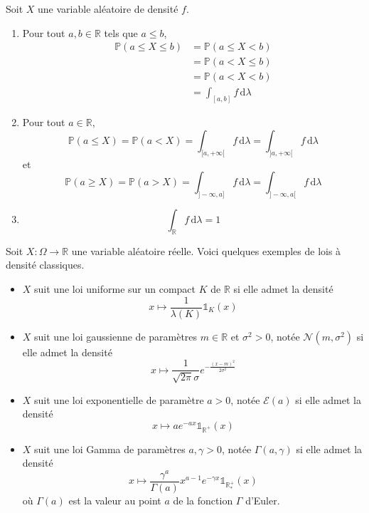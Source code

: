 	\begin{proposition}
		Soit $X$ une variable aléatoire de densité $f$.
		\begin{enumerate}[label=(\roman*)]
			\item Pour tout $a, b \in \mathbb{R}$ tels que $a \leq b$,
			\begin{align*}
				\mathbb{P}(a \leq X \leq b) &= \mathbb{P}(a \leq X < b) \\
				&= \mathbb{P}(a < X \leq b) \\
				&= \mathbb{P}(a < X < b) \\
				&= \int_{[a,b]} f \, \mathrm{d}\lambda
			\end{align*}
			\item Pour tout $a \in \mathbb{R}$,
			\[ \mathbb{P}(a \leq X) = \mathbb{P}(a < X) = \int_{[a,+\infty[} f \, \mathrm{d}\lambda = \int_{]a,+\infty[} f \, \mathrm{d}\lambda \]
			et
			\[ \mathbb{P}(a \geq X) = \mathbb{P}(a > X) = \int_{]-\infty, a]} f \, \mathrm{d}\lambda = \int_{]-\infty, a[} f \, \mathrm{d}\lambda \]
			\item \[ \int_{\mathbb{R}} f \, \mathrm{d}\lambda = 1 \]
		\end{enumerate}
	\end{proposition}


	\begin{example}
		Soit $X : \Omega \rightarrow \mathbb{R}$ une variable aléatoire réelle. Voici quelques exemples de lois à densité classiques.
		\begin{itemize}
			\item $X$ suit une loi uniforme sur un compact $K$ de $\mathbb{R}$ si elle admet la densité
			\[ x \mapsto \frac{1}{\lambda(K)} \mathbb{1}_K(x) \]
			\item $X$ suit une loi gaussienne de paramètres $m \in \mathbb{R}$ et $\sigma^2 > 0$, notée $\mathcal{N}(m, \sigma^2)$ si elle admet la densité
			\[ x \mapsto \frac{1}{\sqrt{2\pi}\sigma} e^{-\frac{(x-m)^2}{2\sigma^2}} \]
			\item $X$ suit une loi exponentielle de paramètre $a > 0$, notée $\mathcal{E}(a)$ si elle admet la densité
			\[ x \mapsto a e^{-ax} \mathbb{1}_{\mathbb{R}^+}(x) \]
			\item $X$ suit une loi Gamma de paramètres $a, \gamma > 0$, notée $\Gamma(a, \gamma)$ si elle admet la densité
			\[ x \mapsto \frac{\gamma^a}{\Gamma(a)} x^{a-1} e^{-\gamma x} \mathbb{1}_{\mathbb{R}^+_*}(x) \]
			où $\Gamma(a)$ est la valeur au point $a$ de la fonction $\Gamma$ d'Euler.
		\end{itemize}
	\end{example}

